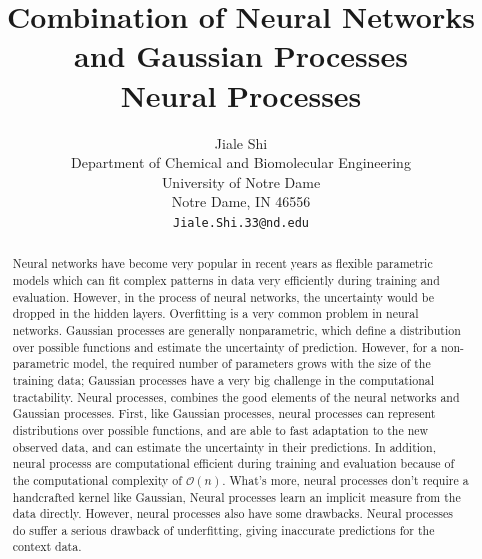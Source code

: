 \documentclass{article}
\title{Combination of Neural Networks and Gaussian Processes \\[0.8em] Neural Processes}
\author{
Jiale Shi\\%
  Department of Chemical and Biomolecular Engineering\\
  University of Notre Dame\\
  Notre Dame, IN 46556 \\
\texttt{Jiale.Shi.33@nd.edu} \\
}
\begin{document}

\maketitle

\begin{abstract}
Neural networks have become very popular in recent years as flexible parametric models which can fit complex patterns in data very efficiently during training and evaluation. However, in the process of neural networks, the uncertainty would be dropped in the hidden layers. Overfitting is a very common problem in neural networks.
Gaussian processes are generally nonparametric, which define a distribution over possible functions and estimate the uncertainty of prediction. However, for a non-parametric model, the required number of parameters grows with the size of the training data; Gaussian processes have a very big challenge in the computational tractability.  Neural processes, combines the good elements of the neural networks and Gaussian processes. First, like Gaussian processes, neural processes can represent distributions over possible functions, and are able to fast adaptation to the new observed data, and can estimate the uncertainty in their predictions. In addition, neural processs are computational efficient during training and evaluation because of the computational complexity of $\mathcal{O}(n)$. What's more, neural processes don't require a handcrafted kernel like Gaussian, Neural processes learn an implicit measure from the data directly. However, neural processes also have some drawbacks. Neural processes do suffer a serious drawback of underfitting, giving inaccurate predictions for the context data.
\end{abstract}
\end{document}
